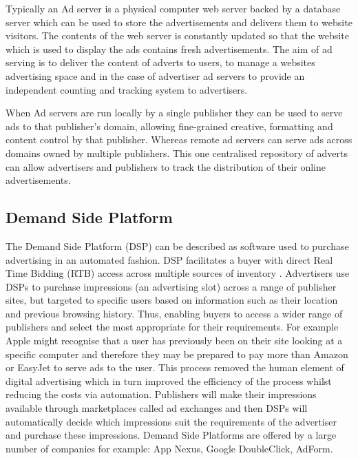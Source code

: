 \documentclass{article}
\begin{document}
Typically an Ad server is a physical computer web server backed by a database server which can be used to store the advertisements and delivers them to website visitors. The contents of the web server is constantly updated so that the website which is used to display the ads contains fresh advertisements. The aim of ad serving is to deliver the content of adverts to users, to manage a websites advertising space and in the case of advertiser ad servers to provide an independent counting and tracking system to advertisers. \newline 

When Ad servers are run locally by a single publisher they can be used to serve ads to that publisher's domain, allowing fine-grained creative, formatting and content control by that publisher. Whereas remote ad servers can serve ads across domains owned by multiple publishers. This one centralised repository of adverts can allow advertisers and publishers to track the distribution of their online advertisements. 
\newline

\subsection{Demand Side Platform} \label{DSP}
The Demand Side Platform (DSP) can be described as software used to purchase advertising in an automated fashion. DSP facilitates a buyer with direct Real Time Bidding (RTB) access across multiple sources of inventory \parencite{introDSP}. Advertisers use DSPs to purchase impressions (an advertising slot) across a range of publisher sites, but targeted to specific users based on information such as their location and previous browsing history. Thus, enabling buyers to access a wider range of publishers and select the most appropriate for their requirements. For example Apple might recognise that a user has previously been on their site looking at a specific computer and therefore they may be prepared to pay more than Amazon or EasyJet to serve ads to the user. This process removed the human element of digital advertising which in turn improved the efficiency of the process whilst reducing the costs via automation. Publishers will make their impressions available through marketplaces called ad exchanges and then DSPs will automatically decide which impressions suit the requirements of the advertiser and purchase these impressions. Demand Side Platforms are offered by a large number of companies for example: App Nexus, Google DoubleClick, AdForm. 
\end{document}

